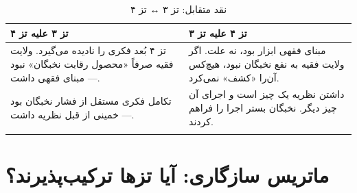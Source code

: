 \documentclass[12pt,a4paper]{book}
\begin{document}
\begin{longtable}{%
    >{\raggedleft\arraybackslash}p{}
    >{\raggedleft\arraybackslash}p{}}
\toprule
\rowcolor{cGold!10}
\textbf{تز ۳ علیه تز ۴} &
\rowcolor{cConsolid!8}
\textbf{تز ۴ علیه تز ۳} \\
\midrule

تز ۴ بُعد فکری را نادیده می‌گیرد. ولایت فقیه صرفاً «محصول رقابت نخبگان» نبود — مبنای فقهی داشت. &
مبنای فقهی ابزار بود، نه علت. اگر ولایت فقیه به نفع نخبگان نبود، هیچ‌کس آن‌را «کشف» نمی‌کرد. \\
\midrule

تکامل فکری مستقل از فشار نخبگان بود — خمینی از قبل نظریه داشت. &
داشتن نظریه یک چیز است و اجرای آن چیز دیگر. نخبگان بستر اجرا را فراهم کردند. \\

\bottomrule
\caption{نقد متقابل: تز ۳ ↔ تز ۴}
\end{longtable}

\section{ماتریس سازگاری: آیا تزها ترکیب‌پذیرند؟}
\end{document}
